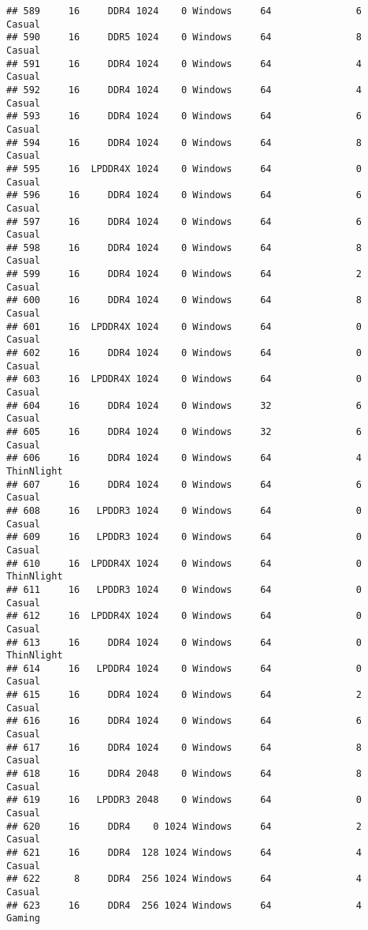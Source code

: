 \documentclass[
]{article}
\begin{document}
\begin{verbatim}
## 589     16     DDR4 1024    0 Windows     64               6     Casual
## 590     16     DDR5 1024    0 Windows     64               8     Casual
## 591     16     DDR4 1024    0 Windows     64               4     Casual
## 592     16     DDR4 1024    0 Windows     64               4     Casual
## 593     16     DDR4 1024    0 Windows     64               6     Casual
## 594     16     DDR4 1024    0 Windows     64               8     Casual
## 595     16  LPDDR4X 1024    0 Windows     64               0     Casual
## 596     16     DDR4 1024    0 Windows     64               6     Casual
## 597     16     DDR4 1024    0 Windows     64               6     Casual
## 598     16     DDR4 1024    0 Windows     64               8     Casual
## 599     16     DDR4 1024    0 Windows     64               2     Casual
## 600     16     DDR4 1024    0 Windows     64               8     Casual
## 601     16  LPDDR4X 1024    0 Windows     64               0     Casual
## 602     16     DDR4 1024    0 Windows     64               0     Casual
## 603     16  LPDDR4X 1024    0 Windows     64               0     Casual
## 604     16     DDR4 1024    0 Windows     32               6     Casual
## 605     16     DDR4 1024    0 Windows     32               6     Casual
## 606     16     DDR4 1024    0 Windows     64               4 ThinNlight
## 607     16     DDR4 1024    0 Windows     64               6     Casual
## 608     16   LPDDR3 1024    0 Windows     64               0     Casual
## 609     16   LPDDR3 1024    0 Windows     64               0     Casual
## 610     16  LPDDR4X 1024    0 Windows     64               0 ThinNlight
## 611     16   LPDDR3 1024    0 Windows     64               0     Casual
## 612     16  LPDDR4X 1024    0 Windows     64               0     Casual
## 613     16     DDR4 1024    0 Windows     64               0 ThinNlight
## 614     16   LPDDR4 1024    0 Windows     64               0     Casual
## 615     16     DDR4 1024    0 Windows     64               2     Casual
## 616     16     DDR4 1024    0 Windows     64               6     Casual
## 617     16     DDR4 1024    0 Windows     64               8     Casual
## 618     16     DDR4 2048    0 Windows     64               8     Casual
## 619     16   LPDDR3 2048    0 Windows     64               0     Casual
## 620     16     DDR4    0 1024 Windows     64               2     Casual
## 621     16     DDR4  128 1024 Windows     64               4     Casual
## 622      8     DDR4  256 1024 Windows     64               4     Casual
## 623     16     DDR4  256 1024 Windows     64               4     Gaming

\end{verbatim}
\end{document}
